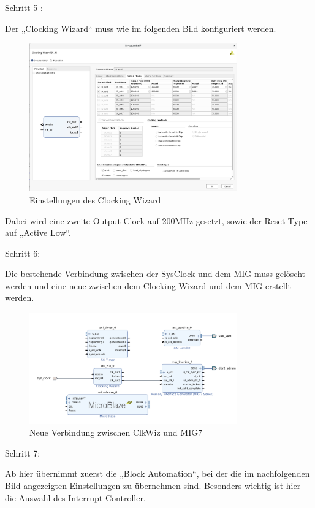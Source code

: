 Schritt 5 :


Der „Clocking Wizard“ muss wie im folgenden Bild konfiguriert werden.

\begin{figure}[H]
\centering
\includegraphics[width=0.8\textwidth]{Hauptteil/Schritt5.png}
\caption{Einstellungen des Clocking Wizard}
\label{fig:mbschritt5}
\end{figure}

Dabei wird eine zweite Output Clock auf 200MHz gesetzt, sowie der Reset Type auf „Active Low“.


Schritt 6:

Die bestehende Verbindung zwischen der SysClock und dem MIG muss gelöscht werden und eine neue zwischen dem Clocking Wizard und dem MIG erstellt werden.

\begin{figure}[H]
\centering
\includegraphics[width=0.8\textwidth]{Hauptteil/schritt6.png}
\caption{Neue Verbindung zwischen ClkWiz und MIG7}
\label{fig:mbschritt6}
\end{figure}


Schritt 7:

Ab hier übernimmt zuerst die „Block Automation“, bei der die im nachfolgenden Bild angezeigten Einstellungen zu übernehmen sind.
Besonders wichtig ist hier die Auswahl des Interrupt Controller.

